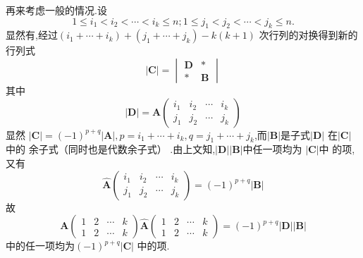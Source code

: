 \begin{green}
\begin{Proof}
再来考虑一般的情况.设
\[
1\leqslant i_1<i_2<\cdots <i_k\leqslant n;
1\leqslant j_1<j_2<\cdots <j_k\leqslant n.
\]
显然有,经过$\left(
    i_1+\cdots+i_k
\right)+\left(j_1+\cdots+j_k\right)
-k\left(k+1\right)$
次行列的对换得到新的行列式
\[
\left|\bm{C}\right|
=
\begin{vmatrix}
    \bm{D} &*\\
    *&\bm{B}
\end{vmatrix}
\]
其中
\[
\left|\bm{D}\right|
=\bm{A}
\begin{pmatrix}
    i_1 & i_2 & \cdots & i_k\\
    j_1 & j_2 & \cdots & j_k
\end{pmatrix}
\]
显然
$\left|\bm{C}\right|
=\left(-1\right)^{p+q}
\left|\bm{A}\right|,p=
i_1+\cdots+i_k,q=
j_1+\cdots+j_k$,而$\left|\bm{B}
\right|$是子式$\left|\bm{D}\right|$
在$\left|\bm{C}\right|$中的
余子式（同时也是代数余子式）
.由上文知,$\left|\bm{D}\right|
\left|\bm{B}\right|$中任一项均为
$\left|\bm{C}\right|$中
的项,又有
\[
\widehat{\bm{A}}
\begin{pmatrix}
    i_1 & i_2 &\cdots &i_k\\
    j_1 & j_2 &\cdots &j_k
\end{pmatrix}
=
\left(-1\right)^{p+q}\left|\bm{B}
\right|
\]
故
\[
\bm{A}\begin{pmatrix}
    1 & 2 &\cdots &k\\
    1 & 2&\cdots&k
\end{pmatrix}
\widehat{\bm{A}}
\begin{pmatrix}
    1 & 2 &\cdots &k\\
    1 & 2&\cdots&k
\end{pmatrix}
=\left(-1\right)^{p+q}
\left|\bm{D}\right|
\left|\bm{B}\right|
\]
中的任一项均为$\left(-1\right)
^{p+q}\left|\bm{C}\right|$
中的项.
\end{Proof}
\end{green}
